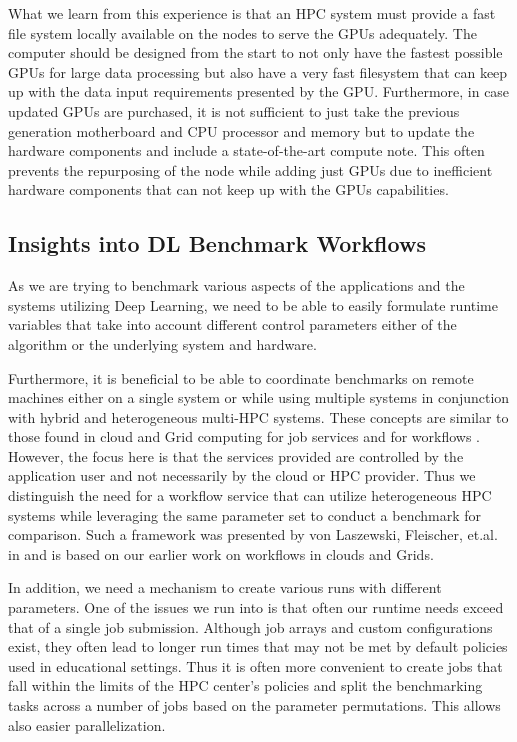 \documentclass[utf8]{FrontiersinVancouver} %
\begin{document}
  What we learn from this experience is that an HPC system must
  provide a fast file system locally available on the nodes to serve
  the GPUs adequately. The computer should be designed from the start
  to not only have the fastest possible GPUs for large data processing
  but also have a very fast filesystem that can keep up with the data
  input requirements presented by the GPU. Furthermore, in case
  updated GPUs are purchased, it is not sufficient to just take the
  previous generation motherboard and CPU processor and memory but to
  update the hardware components and include a state-of-the-art
  compute note. This often prevents the repurposing of the node while
  adding just GPUs due to inefficient hardware components that can not
  keep up with the GPUs capabilities.

  


\subsection{Insights into DL Benchmark Workflows}
\label{sec:workflow-main}

As we are trying to benchmark various aspects of the applications and
the systems utilizing Deep Learning, we need to be able to easily
formulate runtime variables that take into account different control
parameters either of the algorithm or the underlying system and
hardware.

Furthermore, it is beneficial to be able to coordinate benchmarks on
remote machines either on a single system or while using multiple
systems in conjunction with hybrid and heterogeneous multi-HPC
systems. These concepts are similar to those found in cloud and Grid
computing for job services \citep{las-infogram} and for workflows
\citep{las-workflow,las07-workflow}. However, the focus here is that
the services provided are controlled by the application user and not
necessarily by the cloud or HPC provider. Thus we distinguish the need
for a workflow service that can utilize heterogeneous HPC systems
while leveraging the same parameter set to conduct a benchmark for
comparison. Such a framework was presented by von Laszewski,
Fleischer, et.al. in \citep{las-22-arxiv-workflow-cc} and is based on
our earlier work on workflows in clouds and Grids.

In addition, we need a mechanism to create various runs with different
parameters. One of the issues we run into is that often our runtime
needs exceed that of a single job submission. Although job arrays and
custom configurations exist, they often lead to longer run times that
may not be met by default policies used in educational settings. Thus
it is often more convenient to create jobs that fall within the limits
of the HPC center's policies and split the benchmarking tasks across a
number of jobs based on the parameter permutations. This allows also
easier parallelization.
\end{document}

